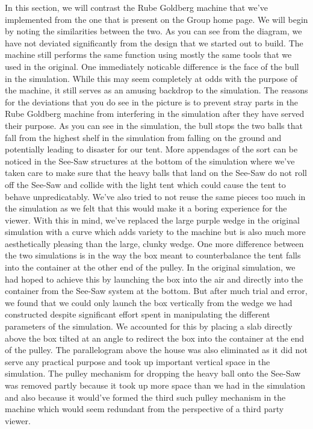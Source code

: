 \documentclass[11pt] {article}
\begin{document}
In this section, we will contrast the Rube Goldberg machine that we've implemented from the one that is present on
the Group home page. We will begin by noting the similarities between the two. As you can see from the diagram, we
have not deviated significantly from the design that we started out to build. The machine still performs the 
same function using mostly the same tools that we used in the original. One immediately noticable difference is 
the face of the bull in the simulation. While this may seem completely at odds with the purpose of the machine, it
still serves as an amusing backdrop to the simulation. The reasons for the deviations that you do see in the
picture is to prevent stray parts in the Rube Goldberg machine from interfering in the simulation after they have
served their purpose. As you can see in the simulation, the bull stops the two balls that fall from the highest
 shelf in the simulation from falling on the ground and potentially leading to disaster for our tent. More appendages
 of the sort can be noticed in the See-Saw structures at the bottom of the simulation where we've taken care to 
 make sure that the heavy balls that land on the See-Saw do not roll off the See-Saw and collide with the light tent
 which could cause the tent to behave unpredicatably. We've also tried to not reuse the same pieces too much in the
 simulation as we felt that this would make it a boring experience for the viewer. With this in mind, we've replaced
 the large purple wedge in the original simulation with a curve which adds variety to the machine but is also
 much more aesthetically pleasing than the large, clunky wedge. One more difference between the two simulations 
 is in the way the box meant to counterbalance the tent falls into the container at the other end of the pulley.
 In the original simulation, we had hoped to achieve this by launching the box into the air and directly into the
 container from the See-Saw system at the bottom. But after much trial and error, we found that we could only
 launch the box vertically from the wedge we had constructed despite significant effort spent in manipulating
 the different parameters of the simulation. We accounted for this by placing a slab directly above the box tilted
 at an angle to redirect the box into the container at the end of the pulley. The parallelogram above the house was
 also eliminated as it did not serve any practical purpose and took up important vertical space in the simulation.
 The pulley mechanism for dropping the heavy ball onto the See-Saw was removed partly because it took up more space
 than we had in the simulation and also because it would've formed the third such pulley mechanism in the machine
 which would seem redundant from the perspective of a third party viewer. 
 
\end{document}
